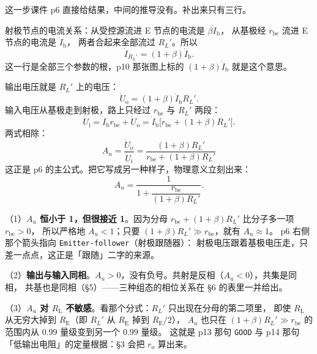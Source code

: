 \documentclass[11pt]{ctexart}
\begin{document}

这一步课件 p6 直接给结果，中间的推导没有。补出来只有三行。

射极节点的电流关系：从受控源流进 E 节点的电流是 $\beta\dot I_{\mathrm{b}}$，
从基极经 $r_{\mathrm{be}}$ 流进 E 节点的电流是 $\dot I_{\mathrm{b}}$，
两者合起来全部流过 $R_L'$。所以
\[
\dot I_{R_L'}=(1+\beta)\dot I_{\mathrm{b}} .
\]
这一行是全部三个参数的根，p10 那张图上标的 $(1+\beta)\dot I_{\mathrm{b}}$ 就是这个意思。

输出电压就是 $R_L'$ 上的电压：
\[
\dot U_{\mathrm{o}}=(1+\beta)\dot I_{\mathrm{b}}R_L' .
\]
输入电压从基极走到射极，路上只经过 $r_{\mathrm{be}}$ 与 $R_L'$ 两段：
\[
\dot U_{\mathrm{i}}=\dot I_{\mathrm{b}}r_{\mathrm{be}}+\dot U_{\mathrm{o}}
=\dot I_{\mathrm{b}}\bigl[r_{\mathrm{be}}+(1+\beta)R_L'\bigr] .
\]
两式相除：
\[
\boxed{\;A_u=\frac{\dot U_{\mathrm{o}}}{\dot U_{\mathrm{i}}}
=\frac{(1+\beta)R_L'}{r_{\mathrm{be}}+(1+\beta)R_L'}\;}
\]
这正是 p6 的主公式。把它写成另一种样子，物理意义立刻出来：
\[
A_u=\frac{1}{1+\dfrac{r_{\mathrm{be}}}{(1+\beta)R_L'}} .
\]



（1）\textbf{$A_u$ 恒小于 1，但很接近 1}。因为分母 $r_{\mathrm{be}}+(1+\beta)R_L'$ 比分子多一项 $r_{\mathrm{be}}>0$，
所以严格地 $A_u<1$；只要 $(1+\beta)R_L'\gg r_{\mathrm{be}}$，就有 $A_u\approx1$。
p6 右侧那个箭头指向 \texttt{Emitter-follower}（射极跟随器）：
射极电压跟着基极电压走，只差一点点，这正是「跟随」二字的来源。

（2）\textbf{输出与输入同相}。$A_u>0$，没有负号。共射是反相（$A_u<0$），共集是同相，
共基也是同相（§5）——三种组态的相位关系在 §6 的表里一并给出。

（3）\textbf{$A_u$ 对 $R_{\mathrm{L}}$ 不敏感}。看那个分式：$R_L'$ 只出现在分母的第二项里，
即使 $R_{\mathrm{L}}$ 从无穷大掉到 $R_{\mathrm{E}}$（即 $R_L'$ 从 $R_{\mathrm{E}}$ 掉到 $R_{\mathrm{E}}/2$），
$A_u$ 也只在 $(1+\beta)R_L'\gg r_{\mathrm{be}}$ 的范围内从 $0.99$ 量级变到另一个 $0.99$ 量级。
这就是 p13 那句 \texttt{GOOD} 与 p14 那句「低输出电阻」的定量根据：§3 会把 $r_{\mathrm{o}}$ 算出来。
\end{document}
